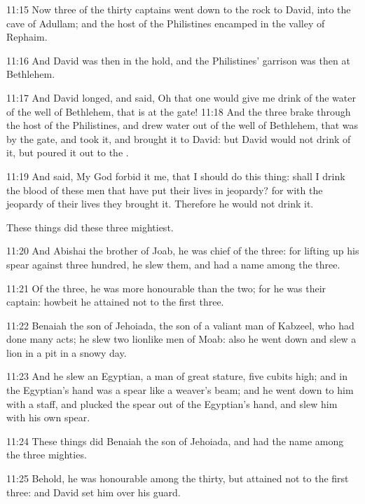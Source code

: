 11:15 Now three of the thirty captains went down to the rock to David,
into the cave of Adullam; and the host of the Philistines encamped in
the valley of Rephaim.

11:16 And David was then in the hold, and the Philistines' garrison
was then at Bethlehem.

11:17 And David longed, and said, Oh that one would give me drink of
the water of the well of Bethlehem, that is at the gate!  11:18 And
the three brake through the host of the Philistines, and drew water
out of the well of Bethlehem, that was by the gate, and took it, and
brought it to David: but David would not drink of it, but poured it
out to the \LORD.

11:19 And said, My God forbid it me, that I should do this thing:
shall I drink the blood of these men that have put their lives in
jeopardy? for with the jeopardy of their lives they brought it.
Therefore he would not drink it.

These things did these three mightiest.

11:20 And Abishai the brother of Joab, he was chief of the three: for
lifting up his spear against three hundred, he slew them, and had a
name among the three.

11:21 Of the three, he was more honourable than the two; for he was
their captain: howbeit he attained not to the first three.

11:22 Benaiah the son of Jehoiada, the son of a valiant man of
Kabzeel, who had done many acts; he slew two lionlike men of Moab:
also he went down and slew a lion in a pit in a snowy day.

11:23 And he slew an Egyptian, a man of great stature, five cubits
high; and in the Egyptian's hand was a spear like a weaver's beam; and
he went down to him with a staff, and plucked the spear out of the
Egyptian's hand, and slew him with his own spear.

11:24 These things did Benaiah the son of Jehoiada, and had the name
among the three mighties.

11:25 Behold, he was honourable among the thirty, but attained not to
the first three: and David set him over his guard.

